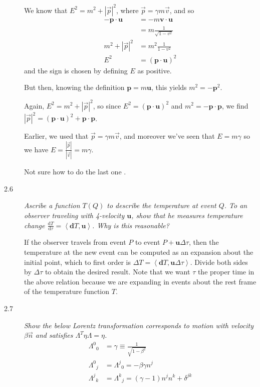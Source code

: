 \documentclass[12pt]{report}
\newcommand{\rd}[2]{\frac{\mathrm{d}#1}{\mathrm{d}#2}}
\newcommand{\abs}[1]{\left|#1\right|}
\newcommand{\expvalue}[1]{\left<#1\right>}
\begin{document}
\begin{description}
        We know that $E^2 = m^2 + \abs{\vec{p}}^2$, where $\vec{p} = \gamma m
        \vec{v}$, and so
        \begin{align}
            -\mathbf{p} \cdot \mathbf{u} &= -m\mathbf{v} \cdot \mathbf{u}
                \nonumber\\
            &= m\frac{1}{\sqrt{1 - v^2}} \nonumber\\
            m^2 + \abs{\vec{p}}^2 &= m^2\frac{1}{1-v^2} \nonumber\\
            E^2 &= (\mathbf{p} \cdot \mathbf{u})^2
        \end{align}
        and the sign is chosen by defining $E$ as positive.

        But then, knowing the definition $\mathbf{p} = m\mathbf{u}$, this yields
        $m^2 = -\mathbf{p}^2$.

        Again, $E^2 = m^2 + \abs{\vec{p}}^2$, so since
        $E^2 = (\mathbf{p} \cdot \mathbf{u})^2$ and $m^2 = -\mathbf{p} \cdot
        \mathbf{p}$, we find
        $\abs{\vec{p}}^2 = (\mathbf{p} \cdot \mathbf{u})^2 + \mathbf{p} \cdot
        \mathbf{p}$.

        Earlier, we used that $\vec{p} = \gamma m \vec{v}$, and moreover we've
        seen that $E = m\gamma$ so we have $E =
        \frac{\abs{\vec{p}}}{\abs{\vec{v}}} = m\gamma$.

        Not sure how to do the last one \frownie.

    \item[2.6] \emph{Ascribe a function $T(Q)$ to describe the temperature at
        event $Q$. To an observer traveling with 4-velocity $\mathbf{u}$, show
        that he measures temperature change $\rd{T}{\tau} =
        \expvalue{\mathbf{d}T, \mathbf{u}}$. Why is this reasonable?}

        If the observer travels from event $P$ to event $P +
        \mathbf{u}\Delta\tau$, then the temperature at the new event can be
        computed as an expansion about the initial point, which to first order
        is $\Delta T = \expvalue{\mathbf{d}T, \mathbf{u}\Delta \tau}$. Divide
        both sides by $\Delta \tau$ to obtain the desired result. Note that we
        want $\tau$ the proper time in the above relation because we are
        expanding in events about the rest frame of the temperature function
        $T$.

    \item[2.7] \emph{Show the below Lorentz transformation corresponds to motion
        with velocity $\beta \vec{n}$ and satisfies $\Lambda^T\eta \Lambda =
        \eta$.}
        \begin{align}
            {\Lambda^0}_0 &= \gamma \equiv \frac{1}{\sqrt{1 - \beta^2}}\\
            {\Lambda^0}_j &= {\Lambda^j}_0 = -\beta\gamma n^j\\
            {\Lambda^j}_k &= {\Lambda^k}_j = (\gamma - 1)n^jn^k + \delta^{jk}
        \end{align}


\end{description}
\end{document}
